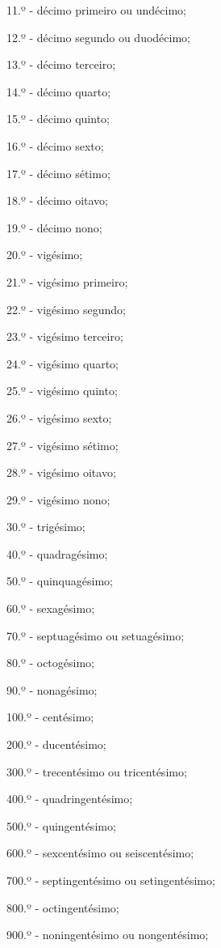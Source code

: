 \begin{multicols*}{2}
\begin{enumerate}
		      11.º - décimo primeiro ou undécimo;

		      12.º - décimo segundo ou duodécimo;

		      13.º - décimo terceiro;

		      14.º - décimo quarto;

		      15.º - décimo quinto;

		      16.º - décimo sexto;

		      17.º - décimo sétimo;

		      18.º - décimo oitavo;

		      19.º - décimo nono;

		      20.º - vigésimo;

		      21.º - vigésimo primeiro;

		      22.º - vigésimo segundo;

		      23.º - vigésimo terceiro;

		      24.º - vigésimo quarto;

		      25.º - vigésimo quinto;

		      26.º - vigésimo sexto;

		      27.º - vigésimo sétimo;

		      28.º - vigésimo oitavo;

		      29.º - vigésimo nono;

		      30.º - trigésimo;

		      40.º - quadragésimo;

		      50.º - quinquagésimo;

		      60.º - sexagésimo;

		      70.º - septuagésimo ou setuagésimo;

		      80.º - octogésimo;

		      90.º - nonagésimo;

		      100.º - centésimo;

		      200.º - ducentésimo;

		      300.º - trecentésimo ou tricentésimo;

		      400.º - quadringentésimo;

		      500.º - quingentésimo;

		      600.º - sexcentésimo ou seiscentésimo;

		      700.º - septingentésimo ou setingentésimo;

		      800.º - octingentésimo;

		      900.º - noningentésimo ou nongentésimo;


\end{enumerate}
\end{multicols*}
